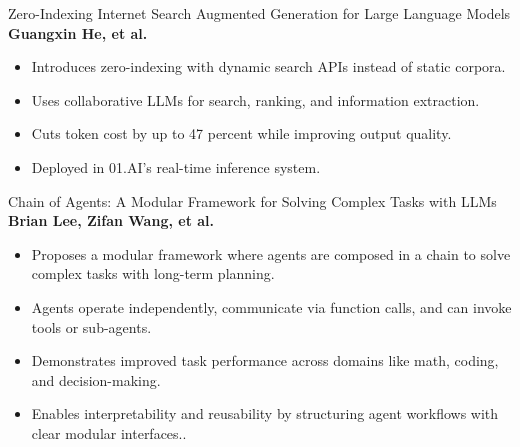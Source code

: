 \documentclass{beamer}
\begin{document}
\begin{frame}{Zero-Indexing Internet Search Augmented Generation for Large
Language Models}
\large\textbf{Guangxin He, et al.}

\normalsize
\begin{itemize}
  \item Introduces zero-indexing with dynamic search APIs instead of static corpora.
  \item Uses collaborative LLMs for search, ranking, and information extraction.
  \item Cuts token cost by up to 47 percent while improving output quality.
  \item Deployed in 01.AI’s real-time inference system.
\end{itemize}

\end{frame}

\begin{frame}{Chain of Agents: A Modular Framework for Solving Complex Tasks with LLMs}
\large\textbf{Brian Lee, Zifan Wang, et al.}

\normalsize
\begin{itemize}
   \item Proposes a modular framework where agents are composed in a chain to solve complex tasks with long-term planning.
    \item Agents operate independently, communicate via function calls, and can invoke tools or sub-agents.
    \item Demonstrates improved task performance across domains like math, coding, and decision-making.
    \item Enables interpretability and reusability by structuring agent workflows with clear modular interfaces..
\end{itemize}

\end{frame}
\end{document}
